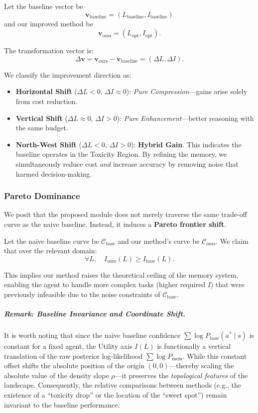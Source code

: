 Let the baseline vector be
\[
\mathbf{v}_{\text{baseline}} = (L_{\text{baseline}}, I_{\text{baseline}})
\]
and our improved method be
\[
\mathbf{v}_{\text{ours}} = (L_{\text{opt}}, I_{\text{opt}}).
\]

The transformation vector is:
\[
\Delta \mathbf{v}
=
\mathbf{v}_{\text{ours}} - \mathbf{v}_{\text{baseline}}
=
(\Delta L, \Delta I).
\]

We classify the improvement direction as:

\begin{itemize}
    \item \textbf{Horizontal Shift} ($\Delta L < 0,\, \Delta I \approx 0$):  
    \emph{Pure Compression}—gains arise solely from cost reduction.

    \item \textbf{Vertical Shift} ($\Delta L \approx 0,\, \Delta I > 0$):  
    \emph{Pure Enhancement}—better reasoning with the same budget.

    \item \textbf{North-West Shift} ($\Delta L < 0,\, \Delta I > 0$):  
    \textbf{Hybrid Gain}.  
    This indicates the baseline operates in the Toxicity Region.  
    By refining the memory, we simultaneously reduce cost \emph{and} increase accuracy by removing noise that harmed decision-making.
\end{itemize}

\subsubsection{Pareto Dominance}

We posit that the proposed module does not merely traverse the same trade-off curve as the naive baseline.  
Instead, it induces a \textbf{Pareto frontier shift}.

Let the naive baseline curve be $\mathcal{C}_{\text{base}}$ and our method's curve be $\mathcal{C}_{\text{ours}}$.  
We claim that over the relevant domain:
\[
\forall L,\quad
I_{\text{ours}}(L) \ge I_{\text{base}}(L).
\]

This implies our method raises the theoretical ceiling of the memory system, enabling the agent to handle more complex tasks (higher required $I$) that were previously infeasible due to the noise constraints of $\mathcal{C}_{\text{base}}$.

\subparagraph{Remark: Baseline Invariance and Coordinate Shift.}
It is worth noting that since the naive baseline confidence $\sum \log P_{\text{base}}(a^* \mid s)$ is constant for a fixed agent, the Utility axis $I(L)$ is functionally a vertical translation of the raw posterior log-likelihood $\sum \log P_{\text{mem}}$. 
While this constant offset shifts the absolute position of the origin $(0,0)$—thereby scaling the absolute value of the density slope $\rho$—it preserves the \textit{topological features} of the landscape. 
Consequently, the relative comparisons between methods (e.g., the existence of a ``toxicity drop'' or the location of the ``sweet spot'') remain invariant to the baseline performance.



